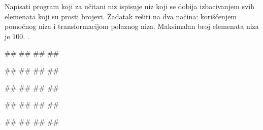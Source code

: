 \ifresenja
\begin{Answer}[ref=deljivi_indeksom]
\end{Answer}
\fi

\begin{Exercise}[label=p.izbacivanje_prostih_elemenata] 
Napisati program koji za učitani niz ispisuje niz koji se dobija
izbacivanjem svih elemenata koji su prosti brojevi. Zadatak rešiti na
dva načina: korišćenjem pomoćnog niza i transformacijom polaznog niza.
Maksimalan broj elemenata niza je $100$.  .

\begin{miditest}
\begin{upotreba}{1}
#\naslovInt#
##
##
##
\end{upotreba}
\end{miditest}
\begin{miditest}
\begin{upotreba}{2}
#\naslovInt#
##
##
##
\end{upotreba}
\end{miditest}

\begin{miditest}
\begin{upotreba}{3}
#\naslovInt#
##
##
##
\end{upotreba}
\end{miditest}
\begin{miditest}
\begin{upotreba}{4}
#\naslovInt#
##
##
#\izlaz{}#
\end{upotreba}
\end{miditest}

\begin{miditest}
\begin{upotreba}{5}
#\naslovInt#
##
##
##
\end{upotreba}
\end{miditest}
\end{Exercise}

